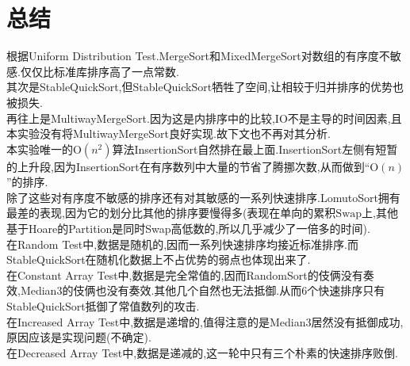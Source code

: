 \documentclass[UTF8]{ctexart}
\newcommand{\gro}{\mathrm{O}}
\begin{document}
\newpage
\begin{figure}[!h]
    \centering
\end{figure}
\newpage
\section{总结}
根据Uniform Distribution Test.MergeSort和MixedMergeSort对数组的有序度不敏感.仅仅比标准库排序高了一点常数.\\
\indent
其次是StableQuickSort,但StableQuickSort牺牲了空间,让相较于归并排序的优势也被损失.\\
\indent
再往上是MultiwayMergeSort.因为这是内排序中的比较,IO不是主导的时间因素,且本实验没有将MultiwayMergeSort良好实现.故下文也不再对其分析.\\
\indent
本实验唯一的$\gro(n^2)$算法InsertionSort自然排在最上面.InsertionSort左侧有短暂的上升段,因为InsertionSort在有序数列中大量的节省了腾挪次数,从而做到``$\gro(n)$''的排序.\\
\indent
除了这些对有序度不敏感的排序还有对其敏感的一系列快速排序.LomutoSort拥有最差的表现,因为它的划分比其他的排序要慢得多(表现在单向的累积$\mathrm{Swap}$上,其他基于Hoare的Partition是同时Swap高低数的,所以几乎减少了一倍多的时间).\\
\indent
在Random Test中,数据是随机的,因而一系列快速排序均接近标准排序.而StableQuickSort在随机化数据上不占优势的弱点也体现出来了.\\
\indent
在Constant Array Test中,数据是完全常值的,因而RandomSort的伎俩没有奏效,Median3的伎俩也没有奏效.其他几个自然也无法抵御.从而6个快速排序只有StableQuickSort抵御了常值数列的攻击.\\
\indent
在Increased Array Test中,数据是递增的,值得注意的是Median3居然没有抵御成功,原因应该是实现问题(不确定).\\
\indent
在Decreased Array Test中,数据是递减的,这一轮中只有三个朴素的快速排序败倒.\\
\end{document}
